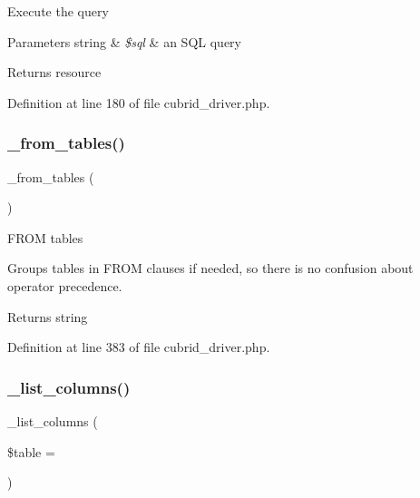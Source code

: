 Execute the query


\begin{DoxyParams}[1]{Parameters}
string & {\em \$sql} & an S\+QL query \\
\hline
\end{DoxyParams}
\begin{DoxyReturn}{Returns}
resource 
\end{DoxyReturn}


Definition at line 180 of file cubrid\+\_\+driver.\+php.

\mbox{\label{class_c_i___d_b__cubrid__driver_aef43f7e3e7b71d337ff3724c5eb14f10}} 
\subsubsection{\texorpdfstring{\_from\_tables()}{\_from\_tables()}}
{\footnotesize\ttfamily \+\_\+from\+\_\+tables (\begin{DoxyParamCaption}{ }\end{DoxyParamCaption})\hspace{0.3cm}{\ttfamily [protected]}}

F\+R\+OM tables

Groups tables in F\+R\+OM clauses if needed, so there is no confusion about operator precedence.

\begin{DoxyReturn}{Returns}
string 
\end{DoxyReturn}


Definition at line 383 of file cubrid\+\_\+driver.\+php.

\mbox{\label{class_c_i___d_b__cubrid__driver_a7ccb7f9c301fe7f0a9db701254142b63}} 
\subsubsection{\texorpdfstring{\_list\_columns()}{\_list\_columns()}}
{\footnotesize\ttfamily \+\_\+list\+\_\+columns (\begin{DoxyParamCaption}\item[{}]{\$table = {\ttfamily \textquotesingle{}\textquotesingle{}} }\end{DoxyParamCaption})\hspace{0.3cm}{\ttfamily [protected]}}

